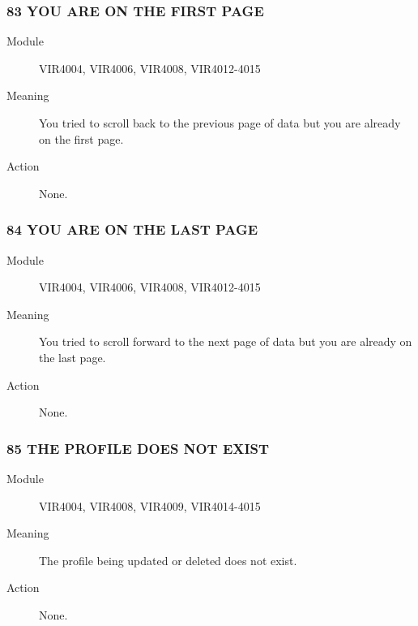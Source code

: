 \documentclass[letterpaper,10pt,english]{sphinxmanual}
\begin{document}
\subsubsection{83 YOU ARE ON THE FIRST PAGE}
\label{\detokenize{messages:id4}}\begin{description}
\item[{Module}] \leavevmode
VIR4004, VIR4006, VIR4008, VIR4012-4015

\item[{Meaning}] \leavevmode
You tried to scroll back to the previous page of data but you are already on the first page.

\item[{Action}] \leavevmode
None.

\end{description}


\subsubsection{84 YOU ARE ON THE LAST PAGE}
\label{\detokenize{messages:id5}}\begin{description}
\item[{Module}] \leavevmode
VIR4004, VIR4006, VIR4008, VIR4012-4015

\item[{Meaning}] \leavevmode
You tried to scroll forward to the next page of data but you are already on the last page.

\item[{Action}] \leavevmode
None.

\end{description}


\subsubsection{85 THE PROFILE DOES NOT EXIST}
\label{\detokenize{messages:the-profile-does-not-exist}}\begin{description}
\item[{Module}] \leavevmode
VIR4004, VIR4008, VIR4009, VIR4014-4015

\item[{Meaning}] \leavevmode
The profile being updated or deleted does not exist.

\item[{Action}] \leavevmode
None.

\end{description}
\end{document}
